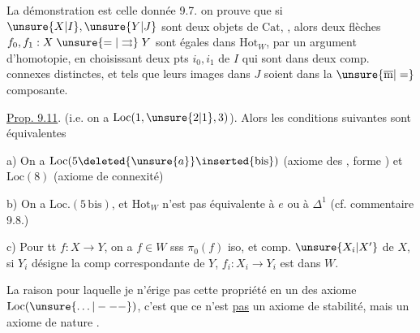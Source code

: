 
La démonstration est celle donnée  9.7.
on prouve que si $\unsure{X|I},\unsure{Y|J}$ sont deux objets
de $\mathrm{Cat}$, , alors deux flèches
$f_0,f_1:X\mathrel{\unsure{=|\rightrightarrows}}Y$ sont égales dans $\mathrm{Hot}_{W}$,
par un argument d'homotopie, en
choisissant deux pts $i_0,i_1$ de $I$ qui
sont dans deux comp. connexes distinctes,
et tels que leurs images  dans $J$
soient dans la $\unsure{\overline{\mathrm m}|=}$ composante.

\uline{Prop. 9.11}.  
(i.e. on a $\mathrm{Loc}(1,\unsure{2|1},3)$). Alors les conditions
suivantes sont équivalentes

a) On a $\mathrm{Loc}(5\deleted{\unsure{a}}\inserted{\mathrm{bis}})$ (axiome des ,
forme ) et $\mathrm{Loc}(8)$ (axiome de connexité)

b) On a $\mathrm{Loc}.(5\,\mathrm{bis})$, et $\mathrm{Hot}_{W}$ n'est pas
équivalente à $e$ ou à $\Delta^1$ (cf. commentaire
9.8.)

c) Pour tt $f:X\to Y$, on a $f\in W$ sss
$\pi_0(f)$ iso, et   comp. 
$\unsure{X_i|X'}$ de $X$, si $Y_i$ désigne la comp correspondante de $Y$,  $f_i:X_i\to Y_i$
est dans $W$.


La raison  pour laquelle je n'érige
pas cette propriété en un des \unsure{-} axiome
$\mathrm{Loc}(\unsure{\ldots|---})$, c'est que ce n'est \uline{pas} un axiome
de stabilité, mais un axiome de nature
.
